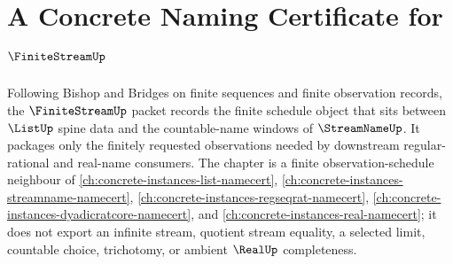 \chapter{A Concrete Naming Certificate for $\FiniteStreamUp$}
\label{ch:concrete-instances-finite-stream-namecert}

Following Bishop and Bridges on finite sequences and finite observation records, the $\FiniteStreamUp$ packet records the finite schedule object that sits between $\ListUp$ spine data and the countable-name windows of $\StreamNameUp$. It packages only the finitely requested observations needed by downstream regular-rational and real-name consumers. The chapter is a finite observation-schedule neighbour of \autoref{ch:concrete-instances-list-namecert}, \autoref{ch:concrete-instances-streamname-namecert}, \autoref{ch:concrete-instances-regseqrat-namecert}, \autoref{ch:concrete-instances-dyadicratcore-namecert}, and \autoref{ch:concrete-instances-real-namecert}; it does not export an infinite stream, quotient stream equality, a selected limit, countable choice, trichotomy, or ambient $\RealUp$ completeness.

